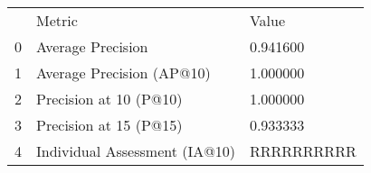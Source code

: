 \begin{tabular}{lll}
 & Metric & Value \\
0 & Average Precision & 0.941600 \\
1 & Average Precision (AP@10) & 1.000000 \\
2 & Precision at 10 (P@10) & 1.000000 \\
3 & Precision at 15 (P@15) & 0.933333 \\
4 & Individual Assessment (IA@10) & RRRRRRRRRR \\
\end{tabular}
